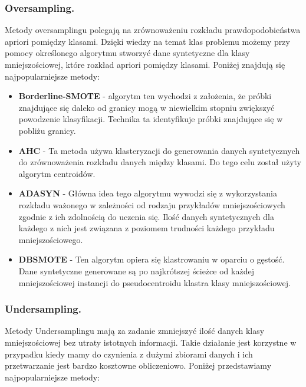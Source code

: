 \documentclass{article}
\begin{document}
\subsubsection{Oversampling.} 
\hfill \break
Metody oversamplingu polegają na zrównoważeniu rozkładu prawdopodobieństwa apriori pomiędzy klasami. Dzięki wiedzy na temat klas problemu możemy przy pomocy określonego algorytmu stworzyć dane syntetyczne dla klasy mniejszościowej, które rozkład apriori pomiędzy klasami. Poniżej znajdują się najpopularniejsze metody:
\begin{itemize}

    \item\textbf{Borderline-SMOTE} - algorytm ten wychodzi z założenia, że próbki znajdujące się daleko od granicy mogą w niewielkim stopniu zwiększyć powodzenie klasyfikacji. Technika ta identyfikuje próbki znajdujące się w pobliżu granicy.
    \newline
    \item \textbf{AHC} - Ta metoda używa klasteryzacji do generowania danych syntetycznych do zrównoważenia rozkładu danych między klasami. Do tego celu został użyty algorytm centroidów.
    \newline
    \item \textbf{ADASYN} - Główna idea tego algorytmu wywodzi się z wykorzystania rozkładu ważonego w zależności od rodzaju przykładów mniejszościowych zgodnie z ich zdolnością do uczenia się. Ilość danych syntetycznych dla każdego z nich jest związana z poziomem trudności każdego przykładu mniejszościowego.
    \newline
    \item \textbf{DBSMOTE} - Ten algorytm opiera się klastrowaniu w oparciu o gęstość. Dane syntetyczne generowane są po  najkrótszej ścieżce od każdej mniejszościowej instancji do pseudocentroidu klastra klasy mniejszościowej.
    \newline
\end{itemize}
\subsubsection{Undersampling.}
\hfill \break
Metody Undersamplingu mają za zadanie zmniejszyć ilość danych klasy mniejszościowej bez utraty istotnych informacji. Takie działanie jest korzystne w przypadku kiedy mamy do czynienia z dużymi zbiorami danych i ich przetwarzanie jest bardzo kosztowne obliczeniowo. Poniżej przedstawiamy najpopularniejsze metody:
\end{document}
